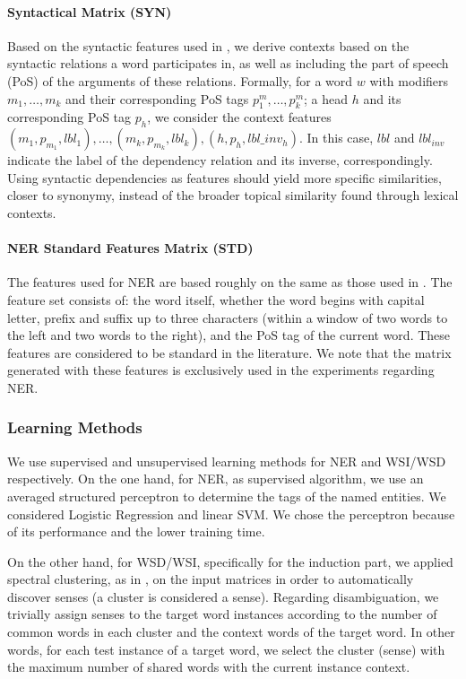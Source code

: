 \paragraph{Syntactical Matrix (SYN)}
Based on the syntactic features used in   \cite{LevyG14,Panchenko2017}, we derive contexts based on the syntactic relations a word participates in, as well as including the part of speech (PoS) of the arguments of these relations. Formally, for a word $w$ with modifiers $m_1, \dots, m_k$ and their corresponding PoS tags $p^m_1, \dots, p^m_k$; a head $h$ and its corresponding PoS tag $p_h$, we consider the context features $(m_1, p_{m_1}, lbl_1), \dots, \allowbreak (m_k, p_{m_k}, lbl_k), \allowbreak (h,p_h,lbl\_inv_h)$. In this case, $lbl$ and $lbl_{inv}$ indicate the label of the dependency relation and its inverse, correspondingly. Using syntactic dependencies as features should yield more specific similarities, closer to synonymy, instead of the broader topical similarity found through lexical contexts.
\paragraph{NER Standard Features Matrix (STD)}
The features used for NER are based roughly on the same as those used in \cite{Daume2006,Balasuriya2009}. The feature set consists of: the word itself, whether the word begins with capital letter, prefix and suffix up to three characters (within a window of two words to the left and two words to the right), and the PoS tag of the current word. These features are considered to be standard in the literature. We note that the matrix generated with these features is exclusively used in the experiments regarding NER.	

\subsubsection{Learning Methods}
We use supervised and unsupervised learning methods for NER and WSI/WSD respectively. On the one hand, for NER, as supervised algorithm, we use an averaged structured perceptron \cite{Collins2002,Daume2006} to determine the tags of the named entities. We considered Logistic Regression and linear SVM. We chose the perceptron because of its performance and the lower training time.

On the other hand, for WSD/WSI, specifically for the induction part, we applied spectral clustering, as in  \cite{GoyalH14}, on the input matrices in order to automatically discover senses (a cluster is considered a sense). Regarding disambiguation, we trivially assign senses to the target word instances according to the number of common words in each cluster and the context words of the target word. In other words, for each test instance of a target word, we select the cluster (sense) with the maximum number of shared words with the current instance context.


